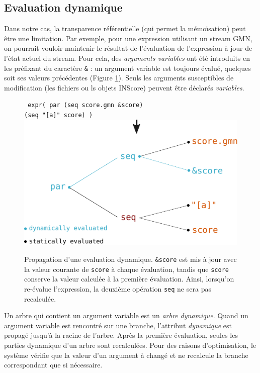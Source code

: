 \documentclass{article}
\newcommand{\OSC}[1]{\texttt{#1}}
\newcommand{\oper}[1]{\textcolor{figRed}{#1}}
\newcommand{\param}[1]{\textcolor{figOrange}{#1}}
\newcommand{\prefix}[1]{\textcolor{figBlue}{#1}}
\newcommand{\tab}{\hspace*{4mm}}
\begin{document}
\subsection{Evaluation dynamique}

Dans notre cas, la transparence référentielle (qui permet la mémoïsation) peut être une limitation. Par exemple, pour une expression utilisant un stream GMN, on pourrait vouloir maintenir le résultat de l'évaluation de l'expression à jour de l'état actuel du stream. Pour cela, des \emph{arguments variables} ont été introduits en les préfixant du caractère \OSC{\&} : un argument variable est toujours évalué, quelques soit ses valeurs précédentes (Figure \ref{fig:dynamicEval}). Seuls les arguments susceptibles de modification (les fichiers ou ls objets INScore) peuvent être déclarés \emph{variables}.

\begin{figure}[th]
\centering
\OSC{ expr( \oper{par} (\oper{seq} \param{score.gmn} \prefix{\&}\param{score}) \\
 \tab\tab\tab\tab (\oper{seq} \param{"[a]" score}) )}
\includegraphics[width=0.9\columnwidth]{imgs/dynamicEval}
\caption{Propagation d'une evaluation dynamique. \OSC{\prefix{\&}\param{score}} est mis à jour avec la valeur courante de \OSC{score} à chaque évaluation, tandis que \OSC{\param{score}} conserve la valeur calculée à la première évaluation. Ainsi, lorsqu'on re-évalue l'expression, la deuxième opération \OSC{\oper{seq}} ne sera pas recalculée. 
}
\label{fig:dynamicEval}
\end{figure}

Un arbre qui contient un argument variable est un \emph{arbre dynamique}. Quand un argument variable est rencontré sur une branche, l'attribut \emph{dynamique} est propagé jusqu'à la racine de l'arbre. Après la première évaluation, seules les parties dynamique d'un arbre sont recalculées. Pour des raisons d'optimisation, le système vérifie que la valeur d'un argument à changé et ne recalcule la branche correspondant que si nécessaire.
\end{document}
